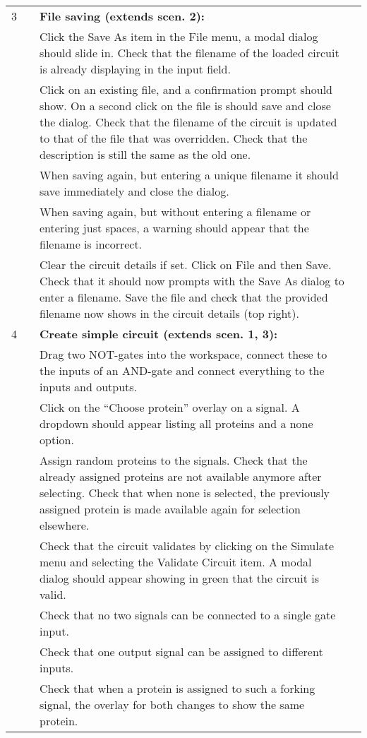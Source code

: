 \documentclass{article}
\newcounter{step}
\newcommand{\step}{\arabic{step}\stepcounter{step}}
\begin{document}
\begin{center}
\begin{longtable}{r r  p{} l }
3 & & \textbf{File saving (extends scen. 2):}\\
&\step& Click the Save As item in the File menu, a modal dialog should slide in. Check that the filename of the loaded circuit is already displaying in the input field.\\
&\step& Click on an existing file, and a confirmation prompt should show.
On a second click on the file is should save and close the dialog. Check that the filename of the circuit is updated to that of the file that was overridden. Check that the description is still the same as the old one.\\
&\step& When saving again, but entering a unique filename it should save immediately and close the dialog.\\
&\step& When saving again, but without entering a filename or entering just spaces, a warning should appear that the filename is incorrect.\\
&\step& Clear the circuit details if set. Click on File and then Save. Check that it should now prompts with the Save As dialog to enter a filename. Save the file and check that the provided filename now shows in the circuit details (top right).\\ \midrule
4 &\setcounter{step}{1}& \textbf{Create simple circuit (extends scen. 1, 3):}\\
&\step& Drag two NOT-gates into the workspace, connect these to the inputs of an AND-gate and connect everything to the inputs and outputs.\\
&\step& Click on the ``Choose protein'' overlay on a signal. A dropdown should appear listing all proteins and a none option.\\
&\step& Assign random proteins to the signals. Check that the already assigned proteins are not available anymore after selecting. Check that when none is selected, the previously assigned protein is made available again for selection elsewhere.\\
&\step& Check that the circuit validates by clicking on the Simulate menu and selecting the Validate Circuit item. A modal dialog should appear showing in green that the circuit is valid.\\
&\step& Check that no two signals can be connected to a single gate input.\\
&\step& Check that one output signal can be assigned to different inputs.\\
&\step& Check that when a protein is assigned to such a forking signal, the overlay for both changes to show the same protein.\\ \midrule

\end{longtable}
\end{center}
\end{document}
